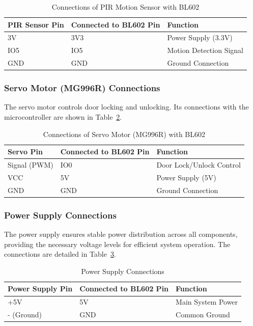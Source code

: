 \documentclass[a4paper]{scrartcl}
\begin{document}
\begin{table}[H]
    \centering
    \begin{tabular}{|l|l|l|}
        \hline
        \textbf{PIR Sensor Pin} & \textbf{Connected to BL602 Pin} & \textbf{Function} \\
        \hline
        3V & 3V3 & Power Supply (3.3V) \\
        IO5 & IO5 & Motion Detection Signal \\
        GND & GND & Ground Connection \\
        \hline
    \end{tabular}
    \caption{Connections of PIR Motion Sensor with BL602}
    \label{tab:pir_connections}
\end{table}

\subsubsection{Servo Motor (MG996R) Connections}
The servo motor controls door locking and unlocking. Its connections with the microcontroller are shown in Table~\ref{tab:servo_connections}.


\begin{table}[H]
    \centering
    \begin{tabular}{|l|l|l|}
        \hline
        \textbf{Servo Pin} & \textbf{Connected to BL602 Pin} & \textbf{Function} \\
        \hline
        Signal (PWM) & IO0 & Door Lock/Unlock Control \\
        VCC & 5V & Power Supply (5V) \\
        GND & GND & Ground Connection \\
        \hline
    \end{tabular}
    \caption{Connections of Servo Motor (MG996R) with BL602}
    \label{tab:servo_connections}
\end{table}

\subsubsection{Power Supply Connections}
The power supply ensures stable power distribution across all components, providing the necessary voltage levels for efficient system operation. The connections are detailed in Table~\ref{tab:power_connections}.


\begin{table}[H]
    \centering
    \begin{tabular}{|l|l|l|}
        \hline
        \textbf{Power Supply Pin} & \textbf{Connected to BL602 Pin} & \textbf{Function} \\
        \hline
        +5V & 5V & Main System Power \\
        - (Ground) & GND & Common Ground \\
        \hline
    \end{tabular}
    \caption{Power Supply Connections}
    \label{tab:power_connections}
\end{table}
\end{document}
